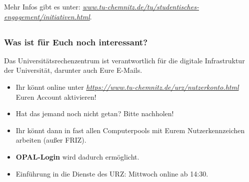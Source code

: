 \documentclass[10pt]{beamer}
\makeatletter
\newcommand{\highl}[1]{\color{tuccolor@ma}#1\color{black}}
\makeatother
\begin{document}
\begin{frame}
	\vspace*{3.8cm}

	Mehr Infos gibt es unter: \highl{\textit{\href{https://www.tu-chemnitz.de/tu/studentisches-engagement/initiativen.html}{www.tu-chemnitz.de/tu/studentisches-engagement/initiativen.html}}}.
\end{frame}

\subsection*{ }

\begin{frame}
	\frametitle{Was ist für Euch noch interessant?}

	\begin{block}{\vphantom{X}}
		Das Universitätsrechenzentrum ist verantwortlich für die digitale Infrastruktur der Universität, darunter auch Eure E-Mails.
	\end{block}

	\begin{itemize}
		\item Ihr könnt online unter \highl{\textit{\href{https://www.tu-chemnitz.de/urz/nutzerkonto.html}{https://www.tu-chemnitz.de/urz/nutzerkonto.html}}}  Euren Account aktivieren!
		\item Hat das jemand noch nicht getan? Bitte nachholen!
		\item Ihr könnt dann in fast allen Computerpools mit Eurem Nutzerkennzeichen arbeiten (außer FRIZ).
		\item \textbf{OPAL-Login} wird dadurch ermöglicht.
		\item Einführung in die Dienste des URZ: Mittwoch online ab 14:30.
	\end{itemize}
\end{frame}
\end{document}
